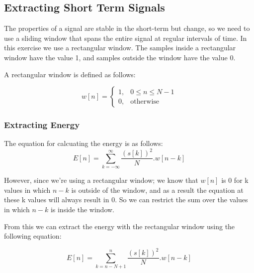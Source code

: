 \documentclass[a4paper]{article}
\begin{document}
\subsection{Extracting Short Term Signals} \label{sec:extract}

The properties of a signal are stable in the short-term but change, so we need
to use a sliding window that spans the entire signal at regular intervals of time.
In this exercise we use a rectangular window. The samples inside a rectangular window
have the value 1, and samples outside the window have the value 0.

A rectangular window is defined as follows: 

\begin{equation}
w[n] =
    \begin{cases}
        1, & 0 \leq n \leq N-1\\
        0, & \text{otherwise}
    \end{cases}
\end{equation}


\subsubsection{Extracting Energy} \label{sec:energy}

The equation for calcuating the energy is as follows:
\begin{equation}
 E[n] = \sum_{k=-\infty}^{\infty}\frac{(s[k])^2}{N}.w[n-k]
\end{equation}

However, since we're using a rectangular window; we know that $w[n]$ is 0 for k values in which $n - k$
is outside of the window, and as a result the equation at these k values will always result in 0. 
So we can restrict the sum over the values in which $n - k$ is inside the window.

From this we can extract the energy with the rectangular window using the following
equation:

\begin{equation}
 E[n] = \sum_{k=n-N+1}^{n}\frac{(s[k])^2}{N}.w[n-k]
\end{equation}
\end{document}
